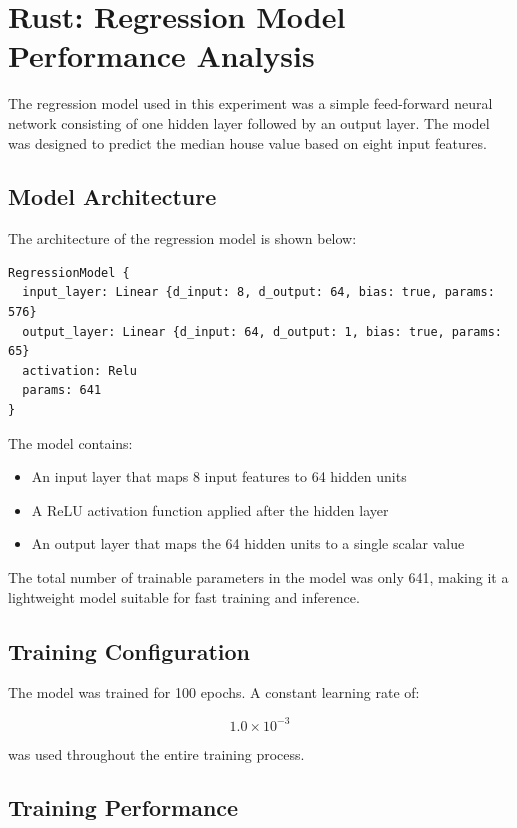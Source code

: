 \documentclass[12pt]{article}
\begin{document}
\section{Rust: Regression Model Performance Analysis}

The regression model used in this experiment was a simple feed-forward neural network consisting of one hidden layer followed by an output layer. The model was designed to predict the median house value based on eight input features.

\subsection{Model Architecture}

The architecture of the regression model is shown below:

\begin{verbatim}
RegressionModel {
  input_layer: Linear {d_input: 8, d_output: 64, bias: true, params: 576}
  output_layer: Linear {d_input: 64, d_output: 1, bias: true, params: 65}
  activation: Relu
  params: 641
}
\end{verbatim}

The model contains:

\begin{itemize}
    \item An input layer that maps 8 input features to 64 hidden units
    \item A ReLU activation function applied after the hidden layer
    \item An output layer that maps the 64 hidden units to a single scalar value
\end{itemize}

The total number of trainable parameters in the model was only 641, making it a lightweight model suitable for fast training and inference.

\subsection{Training Configuration}

The model was trained for 100 epochs. A constant learning rate of:

\[
1.0 \times 10^{-3}
\]

was used throughout the entire training process.

\subsection{Training Performance}
\end{document}

